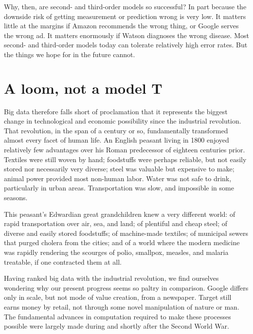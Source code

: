 \documentclass[12pt]{article}
\begin{document}
Why, then, are second- and third-order models so successful? In part
because the downside risk of getting measurement or prediction wrong
is very low. It matters little at the margins if Amazon recommends the
wrong thing, or Google serves the wrong ad. It matters enormously if
Watson diagnoses the wrong disease. Most second- and third-order
models today can tolerate relatively high error rates. But the things
we hope for in the future cannot. 


\section{A loom, not a model T}
\label{sec:loom-not-model}

Big data therefore falls short of proclamation that it represents the
biggest change in technological and economic possibility since the
industrial revolution. That revolution, in the span of a century or
so, fundamentally transformed almost every facet of human life. An
English peasant living in 1800 enjoyed relatively few advantages over
his Roman predecessor of eighteen centuries prior. Textiles were still
woven by hand; foodstuffs were perhaps reliable, but not easily stored
nor necessarily very diverse; steel was valuable but expensive to
make; animal power provided most non-human labor. Water was not safe
to drink, particularly in urban areas. Transportation was slow, and
impossible in some seasons.

This peasant's Edwardian great grandchildren knew a very different
world: of rapid transportation over air, sea, and land; of plentiful
and cheap steel; of diverse and easily stored foodstuffs; of
machine-made textiles; of municipal sewers that purged cholera from
the cities; and of a world where the modern medicine
was rapidly rendering the scourges of polio, smallpox, measles,
and malaria treatable, if one contracted them at all. 

Having ranked big data with the industrial revolution, we find
ourselves wondering why our present progress seems so paltry in
comparison. Google differs only in scale, but not mode of value
creation, from a newspaper. Target still earns money by retail, not
through some novel manipulation of nature or man. The fundamental
advances in computation required to make these processes possible were
largely made during and shortly after the Second World War. 

\end{document}
